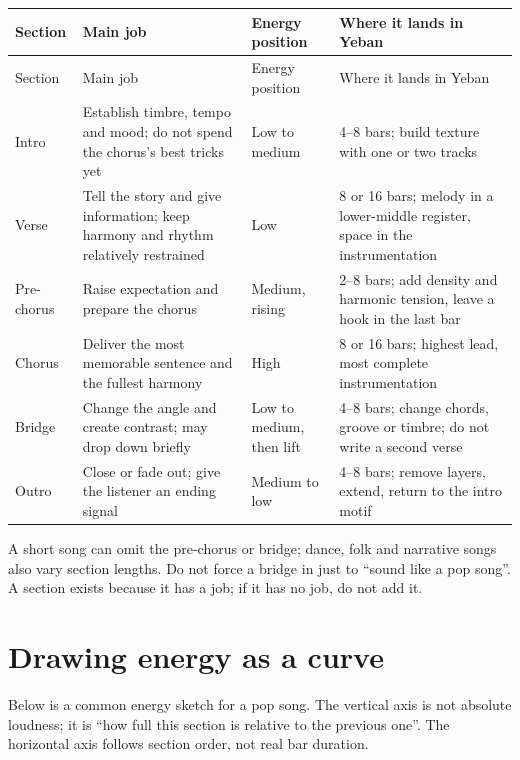 \begin{longtable}{p{}p{}p{}p{}}
\toprule
Section & Main job & Energy position & Where it lands in Yeban \\
\midrule
\endfirsthead
\toprule
Section & Main job & Energy position & Where it lands in Yeban \\
\midrule
\endhead
Intro & Establish timbre, tempo and mood; do not spend the chorus's best tricks yet & Low to medium & 4--8 bars; build texture with one or two tracks \\
Verse & Tell the story and give information; keep harmony and rhythm relatively restrained & Low & 8 or 16 bars; melody in a lower-middle register, space in the instrumentation \\
Pre-chorus & Raise expectation and prepare the chorus & Medium, rising & 2--8 bars; add density and harmonic tension, leave a hook in the last bar \\
Chorus & Deliver the most memorable sentence and the fullest harmony & High & 8 or 16 bars; highest lead, most complete instrumentation \\
Bridge & Change the angle and create contrast; may drop down briefly & Low to medium, then lift & 4--8 bars; change chords, groove or timbre; do not write a second verse \\
Outro & Close or fade out; give the listener an ending signal & Medium to low & 4--8 bars; remove layers, extend, return to the intro motif \\
\bottomrule
\end{longtable}

A short song can omit the pre-chorus or bridge; dance, folk and narrative songs also vary section lengths. Do not force a bridge in just to ``sound like a pop song''. A section exists because it has a job; if it has no job, do not add it.

\section{Drawing energy as a curve}
\label{sec:energy-curve}

Below is a common energy sketch for a pop song. The vertical axis is not absolute loudness; it is ``how full this section is relative to the previous one''. The horizontal axis follows section order, not real bar duration.

